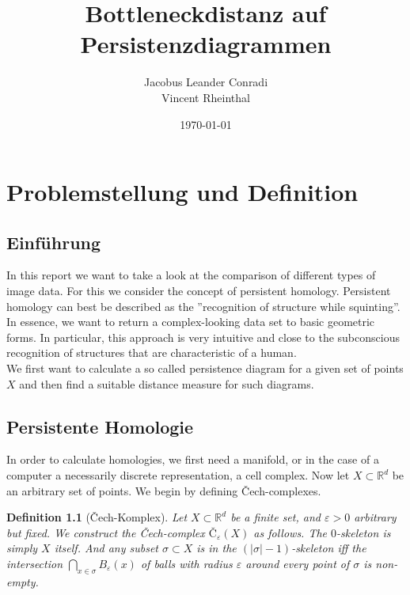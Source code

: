 \documentclass[11pt, a4paper,draft]{report}
\author{Jacobus Leander Conradi\\Vincent Rheinthal}
\date{\today}
\title{Bottleneckdistanz auf Persistenzdiagrammen}
\newtheorem{definition}{Definition}
\newcommand{\bR}{\mathbb{R}}
\begin{document}
 
	\maketitle
	
	\thispagestyle{plain}
	\addtocounter{page}{-1}
	\tableofcontents 
	\vfil\null
	\clearpage
	\thispagestyle{empty}\mbox{}
	\clearpage
	
	\chapter{Problemstellung und Definition}
	\section{Einführung}
	In this report we want to take a look at the comparison of different types of image data. For this we consider the concept of persistent homology. Persistent homology can best be described as the ''recognition of structure while squinting''. In essence, we want to return a complex-looking data set to basic geometric forms. In particular, this approach is very intuitive and close to the subconscious recognition of structures that are characteristic of a human.\\
	We first want to calculate a so called persistence diagram for a given set of points $X$ and then find a suitable distance measure for such diagrams.
	
	
	\section{Persistente Homologie}
	
	In order to calculate homologies, we first need a manifold, or in the case of a computer a necessarily discrete representation, a cell complex. Now let $X\subset \bR^d$ be an arbitrary set of points. We begin by defining Čech-complexes.
	
	\begin{definition}[Čech-Komplex]
		Let $X\subset \bR^d$ be a finite set, and $\varepsilon>0$ arbitrary but fixed. We construct the Čech-complex $Č_\varepsilon(X)$ as follows. The $0$-skeleton is simply $X$ itself. And any subset $\sigma\subset X$ is in the $(|\sigma|-1)$-skeleton iff the intersection $\bigcap_{x\in\sigma}B_\varepsilon(x)$ of balls with radius $\varepsilon$ around every point of $\sigma$ is non-empty.
	\end{definition}
\end{document}
